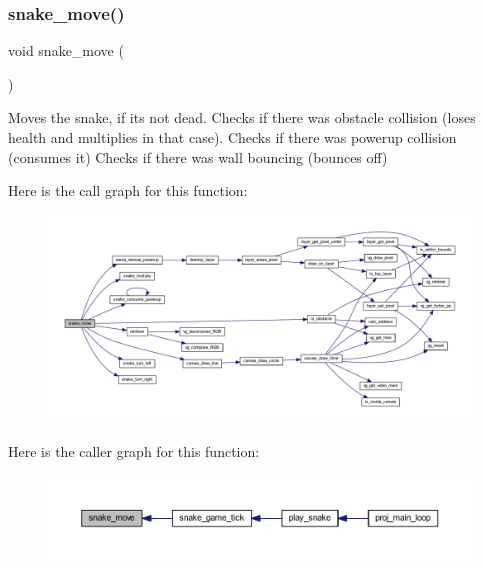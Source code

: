 \subsubsection{\texorpdfstring{snake\+\_\+move()}{snake\_move()}}
{\footnotesize\ttfamily void snake\+\_\+move (\begin{DoxyParamCaption}{ }\end{DoxyParamCaption})}



Moves the snake, if it\textquotesingle{}s not dead. Checks if there was obstacle collision (loses health and multiplies in that case). Checks if there was powerup collision (consumes it) Checks if there was wall bouncing (bounces off) 

Here is the call graph for this function\+:\nopagebreak
\begin{figure}[H]
\begin{center}
\leavevmode
\includegraphics[width=350pt]{group__snake_ga18a5d5f3ad1a2a71338cf50900d6169e_cgraph}
\end{center}
\end{figure}
Here is the caller graph for this function\+:\nopagebreak
\begin{figure}[H]
\begin{center}
\leavevmode
\includegraphics[width=350pt]{group__snake_ga18a5d5f3ad1a2a71338cf50900d6169e_icgraph}
\end{center}
\end{figure}
\mbox{\label{group__snake_gae3dcf4434c60729af7c3280262e8c6ad}} 
